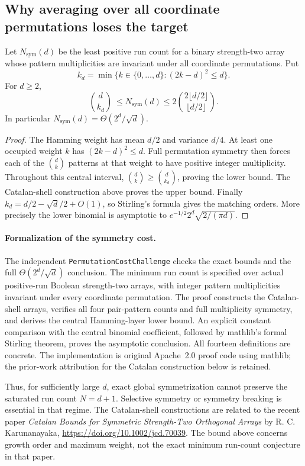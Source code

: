 \subsection{Why averaging over all coordinate permutations loses the target}
\begin{proposition}
Let $N_{\mathrm{sym}}(d)$ be the least positive run count for a binary
strength-two array whose pattern multiplicities are invariant under all
coordinate permutations. Put
\[
 k_d=\min\{k\in\{0,\ldots,d\}:(2k-d)^2\le d\}.
\]
For $d\ge2$,
\[
 \binom d{k_d}\ \le N_{\mathrm{sym}}(d)
 \le 2\binom{2\lfloor d/2\rfloor}{\lfloor d/2\rfloor}.
\]
In particular $N_{\mathrm{sym}}(d)=\Theta(2^d/\sqrt d)$.
\end{proposition}
\begin{proof}
The Hamming weight has mean $d/2$ and variance $d/4$. At least one
occupied weight $k$ has $(2k-d)^2\le d$. Full permutation symmetry
then forces each of the $\binom dk$ patterns at that weight to have
positive integer multiplicity. Throughout this central interval,
$\binom dk\ge\binom d{k_d}$, proving the lower bound. The Catalan-shell
construction above proves the upper bound. Finally
$k_d=d/2-\sqrt d/2+O(1)$, so Stirling's formula gives the matching
orders. More precisely the lower binomial is asymptotic to
$e^{-1/2}2^d\sqrt{2/(\pi d)}$.
\end{proof}

\paragraph{Formalization of the symmetry cost.}
The independent \texttt{PermutationCostChallenge} checks the exact bounds
and the full $\Theta(2^d/\sqrt d)$ conclusion. The minimum run count is
specified over actual positive-run Boolean strength-two arrays, with
integer pattern multiplicities invariant under every coordinate
permutation. The proof constructs the Catalan-shell arrays, verifies all
four pair-pattern counts and full multiplicity symmetry, and derives the
central Hamming-layer lower bound. An explicit constant comparison with
the central binomial coefficient, followed by mathlib's formal Stirling
theorem, proves the asymptotic conclusion. All fourteen definitions are
concrete. The implementation is original Apache~2.0 proof code using
mathlib; the prior-work attribution for the Catalan construction below
is retained.

Thus, for sufficiently large $d$, exact global symmetrization cannot
preserve the saturated run count $N=d+1$. Selective symmetry or symmetry
breaking is essential in that regime. The
Catalan-shell constructions are related to the recent paper
\emph{Catalan Bounds for Symmetric Strength-Two Orthogonal Arrays}
by R. C. Karunanayaka,
\url{https://doi.org/10.1002/jcd.70039}.
The bound above concerns growth order and maximum weight, not the exact
minimum run-count conjecture in that paper.

